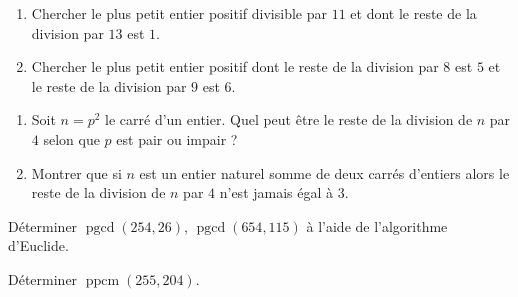 \documentclass[11pt,class=report,crop=false]{standalone}
\newcommand{\pgcd}{\mathop{\mathrm{pgcd}}\nolimits}
\newcommand{\ppcm}{\mathop{\mathrm{ppcm}}\nolimits}
\begin{document}
    




\bigskip
\bigskip



\exercice{}
\enonce
\sauteligne
 \begin{enumerate}
  \item Chercher le plus petit entier positif divisible par $11$ et dont le reste de la division par $13$ est $1$.
  
  \item Chercher le plus petit entier positif dont le reste de la division par $8$ est $5$ et le reste de la division par $9$ est $6$.
\end{enumerate} 
\finenonce


\finexercice


\exercice{}
\enonce
\sauteligne
\begin{enumerate}
    \item Soit $n=p^2$ le carré d'un entier. Quel peut être le reste de la division de $n$ par $4$ selon que $p$ est pair ou impair ?
    \item Montrer que si $n$ est un entier naturel somme de deux carrés d'entiers 
    alors le reste de la division de $n$ par $4$ n'est jamais égal à $3$.
\end{enumerate}


\finenonce 


\finexercice



\exercice{}
\enonce
Déterminer $\pgcd(254, 26)$, $\pgcd(654, 115)$ à l'aide de l'algorithme d'Euclide.
\finenonce


\finexercice



\exercice{}
\enonce
Déterminer $\ppcm(255, 204)$.
\finenonce


\finexercice
\end{document}
